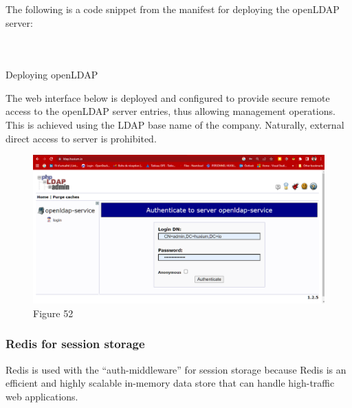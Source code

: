 The following is a code snippet from the manifest for deploying the openLDAP server: 

\begin{listing}[H]
\inputminted[firstline=1,lastline=10]{Yaml}{codeListing/deploy_openldap.yml}
\end{listing} 

\begin{listing}[H]
\inputminted[firstline=16,lastline=55]{Yaml}{codeListing/deploy_openldap.yml}
\end{listing} 

\begin{listing}[H]
\inputminted[firstline=56]{Yaml}{codeListing/deploy_openldap.yml}
\caption{Deploying openLDAP}
\label{lst:Deploying_openLDAP}
\end{listing} 


The web interface below is deployed and configured to provide secure remote access to the openLDAP server entries, thus allowing management operations. This is achieved using the LDAP base name of the company. Naturally, external direct access to server is prohibited. 
\begin{figure}[H]\centering
\includegraphics[width=1.0\textwidth,angle=00]{assets/f52.png}
\caption{Figure 52 }
\label{fig:f52}
\end{figure} 

\subsubsection{Redis for session storage }

Redis is used with the “auth-middleware” for session storage because Redis is an efficient and highly scalable in-memory data store that can handle high-traffic web applications. 

